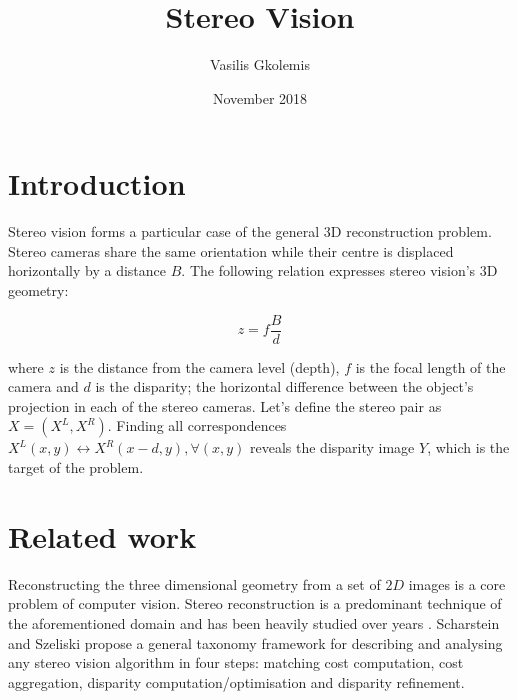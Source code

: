\documentclass[10pt]{article}
\title{Stereo Vision}
\author{Vasilis Gkolemis}
\date{November 2018}
\begin{document}
\maketitle

\section{Introduction}

Stereo vision forms a particular case of the general 3D reconstruction problem. Stereo cameras share the same orientation while their centre is displaced horizontally by a distance $B$. The following relation expresses stereo vision's 3D geometry:

\begin{equation} \label{eq:stereo_geometry}
z = f\frac{B}{d}
\end{equation}

where $z$ is the distance from the camera level (depth), $f$ is the focal length of the camera and $d$ is the disparity; the horizontal difference between the object's projection in each of the stereo cameras. Let's define the stereo pair as $X = (X^L, X^R)$. Finding all correspondences $X^L(x,y) \leftrightarrow X^R(x-d, y), \forall (x,y)$ reveals the disparity image $Y$, which is the target of the problem.

\section{Related work}

Reconstructing the three dimensional geometry from a set of $2D$ images is a core problem of computer vision. Stereo reconstruction is a predominant technique of the aforementioned domain and has been heavily studied over years \cite{Barnard1982ComputationalStereo, Brown2003}. Scharstein and Szeliski \cite{Scharstein2001AAlgorithms} propose a general taxonomy framework for describing and analysing any stereo vision algorithm in four steps: matching cost computation, cost aggregation, disparity computation/optimisation and disparity refinement.
\end{document}
